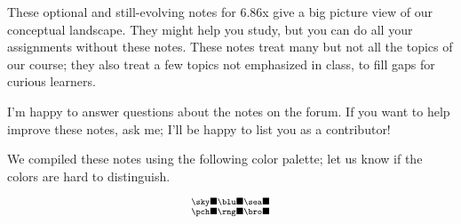 \documentclass[11pt, justified]{tufte-book}
\begin{document}

  

  These optional and still-evolving notes for 6.86x give a big picture view of
  our conceptual landscape.  They might help you study, but you can do all your
  assignments without these notes.  These notes treat many but not all the
  topics of our course; they also treat a few topics not emphasized in class,
  to fill gaps for curious learners.

  I'm happy to answer questions about the notes on the forum.  If you want to
  help improve these notes, ask me; I'll be happy to list you as a contributor!

  We compiled these notes using the following color palette; let us know if
  the colors are hard to distinguish.

  {\Huge\vspace{-1.5cm}\[\substack{%
    {\sky\blacksquare}
    {\blu\blacksquare}
    {\sea\blacksquare}\\
    {\pch\blacksquare}
    {\rng\blacksquare}
    {\bro\blacksquare}}
    \]}
\end{document}
